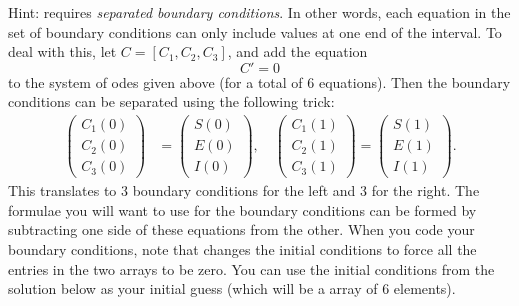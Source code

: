 \begin{problem}
Hint:  requires \emph{separated boundary conditions}.
In other words, each equation in the set of boundary conditions can only include values at one end of the interval.
To deal with this, let $C = [C_1, C_2, C_3]$, and add the equation
\[C' = 0\]
to the system of odes given above (for a total of 6 equations).
Then the boundary conditions can be separated using the following trick:
\begin{align*}
	\begin{pmatrix}C_1(0) \\C_2(0) \\ C_3(0) \end{pmatrix} &= \begin{pmatrix}S(0) \\E(0) \\ I(0) \end{pmatrix}, \quad 	\begin{pmatrix}C_1(1) \\C_2(1) \\ C_3(1) \end{pmatrix} = \begin{pmatrix}S(1) \\E(1) \\ I(1) \end{pmatrix}.
\end{align*}
This translates to 3 boundary conditions for the left and 3 for the right.
The formulae you will want to use for the boundary conditions can be formed by subtracting one side of these equations from the other.
When you code your boundary conditions, note that  changes the initial conditions to force all the entries in the two arrays to be zero.
You can use the initial conditions from the solution below as your initial guess (which will be a array of 6 elements).

\label{prob:sir_measles}
\end{problem} 